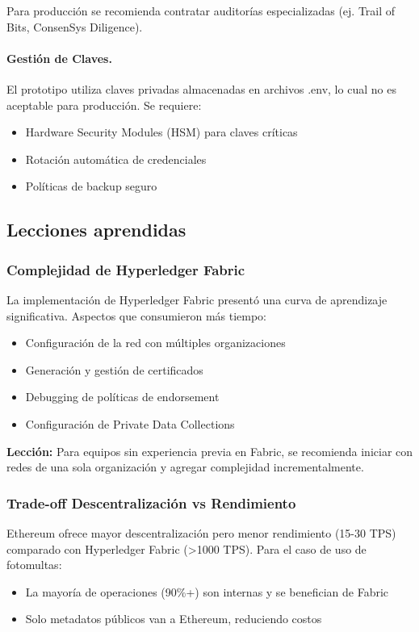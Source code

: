 Para producción se recomienda contratar auditorías especializadas (ej. Trail of Bits, ConsenSys Diligence).

\paragraph{Gestión de Claves.}
El prototipo utiliza claves privadas almacenadas en archivos .env, lo cual no es aceptable para producción. Se requiere:
\begin{itemize}
    \item Hardware Security Modules (HSM) para claves críticas
    \item Rotación automática de credenciales
    \item Políticas de backup seguro
\end{itemize}

\subsection{Lecciones aprendidas}

\subsubsection{Complejidad de Hyperledger Fabric}

La implementación de Hyperledger Fabric presentó una curva de aprendizaje significativa. Aspectos que consumieron más tiempo:
\begin{itemize}
    \item Configuración de la red con múltiples organizaciones
    \item Generación y gestión de certificados
    \item Debugging de políticas de endorsement
    \item Configuración de Private Data Collections
\end{itemize}

\textbf{Lección:} Para equipos sin experiencia previa en Fabric, se recomienda iniciar con redes de una sola organización y agregar complejidad incrementalmente.

\subsubsection{Trade-off Descentralización vs Rendimiento}

Ethereum ofrece mayor descentralización pero menor rendimiento (15-30 TPS) comparado con Hyperledger Fabric (>1000 TPS). Para el caso de uso de fotomultas:
\begin{itemize}
    \item La mayoría de operaciones (90\%+) son internas y se benefician de Fabric
    \item Solo metadatos públicos van a Ethereum, reduciendo costos
\end{itemize}

